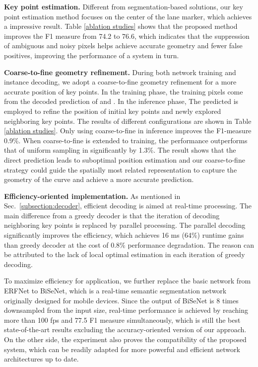 \documentclass[final]{cvpr}
\begin{document}
\textbf{Key point estimation.} Different from segmentation-based solutions, our key point estimation method focuses on the center of the lane marker, which achieves a impressive result. Table \ref{ablation studies} shows that the proposed method improves the F1 measure from 74.2 to 76.6, which indicates that the suppression of ambiguous and noisy pixels helps achieve accurate geometry and fewer false positives, improving the performance of a system in turn.

\textbf{Coarse-to-fine geometry refinement.} During both network training and instance decoding, we adopt a coarse-to-fine geometry refinement for a more accurate position of key points. In the training phase, the training pixels come from the decoded prediction of  and . In the inference phase, The predicted  is employed to refine the position of initial key points and newly explored neighboring key points. The results of different configurations are shown in Table \ref{ablation studies}. Only using coarse-to-fine in inference improves the F1-measure 0.9\%. When coarse-to-fine is extended to training, the performance outperforms that of uniform sampling in  significantly by 1.3\%. The result shows that the direct prediction leads to suboptimal position estimation and our coarse-to-fine strategy could guide the spatially most related representation to capture the geometry of the curve and achieve a more accurate prediction.

\textbf{Efficiency-oriented implementation.} As mentioned in  Sec.~\ref{subsection:decoder}, efficient decoding is aimed at real-time processing. The main difference from a greedy decoder is that the iteration of decoding neighboring key points is replaced by parallel processing. The parallel decoding significantly improves the efficiency, which achieves 16 ms (64\%) runtime gains than greedy decoder at the cost of 0.8\% performance degradation. The reason can be attributed to the lack of local optimal estimation in each iteration of greedy decoding. 

To maximize efficiency for application, we further replace the basic network from ERFNet to BiSeNet, which is a real-time semantic segmentation network originally designed for mobile devices. Since the output of BiSeNet is 8 times downsampled from the input size, real-time performance is achieved by reaching  more than 100 fps and 77.5 F1 measure simultaneously, which is still the best state-of-the-art results excluding the accuracy-oriented version of our approach. On the other side, the experiment also proves the compatibility of the proposed system, which can be readily adapted for more powerful and efficient network architectures up to date.
\end{document}
